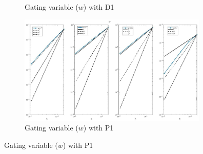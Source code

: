\documentclass[a4paper,11pt]{article}
\begin{document}
\begin{figure}[h]
\begin{subfigure}{0.5\textwidth}
\caption{Gating variable ($w$) with D1}
\end{subfigure}
\begin{subfigure}{0.5\textwidth}
\includegraphics[width =9cm]{./P1_w_1.jpg}
\caption{Gating variable ($w$) with P1}
\end{subfigure}
\end{figure}
\restoregeometry
\newpage
{} 
\end{document}
